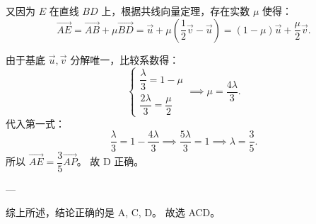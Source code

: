 {  又因为 \(E\) 在直线 \(BD\) 上，根据共线向量定理，存在实数 \(\mu\) 使得：
  \[
    \overrightarrow{AE} = \overrightarrow{AB} + \mu \overrightarrow{BD} = \vec{u} + \mu\left(\frac{1}{2}\vec{v} - \vec{u}\right) = (1 - \mu)\vec{u} + \frac{\mu}{2}\vec{v}.
  \]

  由于基底 \(\vec{u}, \vec{v}\) 分解唯一，比较系数得：
  \[
    \begin{cases}
      \dfrac{\lambda}{3} = 1 - \mu \\[6pt]
      \dfrac{2\lambda}{3} = \dfrac{\mu}{2}
    \end{cases}
    \implies \mu = \frac{4\lambda}{3}.
  \]
  代入第一式：
  \[
    \frac{\lambda}{3} = 1 - \frac{4\lambda}{3} \implies \frac{5\lambda}{3} = 1 \implies \lambda = \frac{3}{5}.
  \]
  所以 \(\overrightarrow{AE} = \dfrac{3}{5}\overrightarrow{AP}\)。
  故 D 正确。

  ---

  综上所述，结论正确的是 A, C, D。
  故选 ACD。%
}
